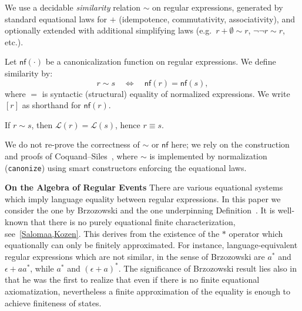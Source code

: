 \begin{definition}\label{def:similarity}
We use a decidable \emph{similarity} relation $\sim$ on regular expressions,
generated by standard equational laws for $+$ (idempotence, commutativity, associativity),
and optionally extended with additional simplifying laws (e.g.\ $r+\emptyset\sim r$, $\neg\neg r\sim r$, etc.).
\end{definition}

\begin{definition}[Canonicalization]\label{def:canonize}
Let $\mathsf{nf}(\cdot)$ be a canonicalization function on regular expressions.
We define similarity by:
\[
  r \sim s \quad\Longleftrightarrow\quad \mathsf{nf}(r)=\mathsf{nf}(s),
\]
where $=$ is syntactic (structural) equality of normalized expressions.
We write $[r]$ as shorthand for $\mathsf{nf}(r)$.
\end{definition}

\begin{lemma}\label{lem:similarity-sound}
If $r \sim s$, then $\mathcal{L}(r)=\mathcal{L}(s)$, hence $r \equiv s$.
\end{lemma}

\begin{remark}\label{rem:similarity-cites}
We do not re-prove the correctness of $\sim$ or $\mathsf{nf}$ here; we rely on the
construction and proofs of Coquand--Siles~\cite{CoquandRegexEquality}, where $\sim$ is implemented by normalization
(\texttt{canonize}) using smart constructors enforcing the equational laws.
\end{remark}

{\color{red} \begin{remark}{\bf On the Algebra of Regular Events}
There are various equational systems which imply language equality between regular expressions. In this paper we consider the one by Brzozowski and the one underpinning Definition~\cite{def:canonize}. It is well-known that there is no purely equational finite characterization, see~\ref{Salomaa,Kozen}. This derives from the existence of the $\ast$ operator which equationally can only be finitely approximated. For instance, language-equivalent regular expressions which are not similar, in the sense of Brzozowski are $a^\ast$ and $\epsilon +aa^\ast$, while $a^\ast$ and $(\epsilon+a)^\ast$. The significance of Brzozowski result lies also in that he was the first to realize that even if there is no finite equational axiomatization, nevertheless a finite approximation of the equality is enough to achieve finiteness of states.  
\end{remark}}

